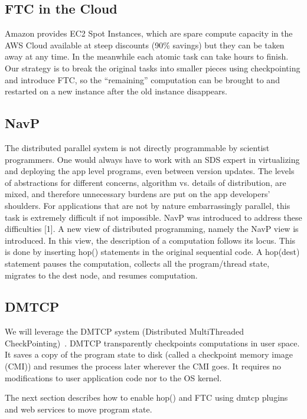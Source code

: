 \documentclass[conference]{IEEEtran}
\begin{document}
\subsection{FTC in the Cloud}
\label{subsec:s11}

Amazon provides EC2 Spot Instances, which are spare compute capacity in the AWS Cloud available at steep discounts (90\% savings) but they can be taken away at any time. In the meanwhile each atomic task can take hours to finish. Our strategy is to break the original tasks into smaller pieces using checkpointing and introduce FTC, so the ``remaining'' computation can be brought to and restarted on a new instance after the old instance disappears.

\subsection{NavP}
\label{subsec:s12}

The distributed parallel system is not directly programmable by scientist programmers. One would always have to work with an SDS expert in virtualizing and deploying the app level programs, even between version updates. The levels of abstractions for different concerns, algorithm vs. details of distribution, are mixed, and therefore unnecessary burdens are put on the app developers’ shoulders. For applications that are not by nature embarrassingly parallel, this task is extremely difficult if not impossible. NavP was introduced to address these difficulties [1]. A new view of distributed programming, namely the NavP view is introduced. In this view, the description of a computation follows its locus. This is done by inserting  hop() statements in the original sequential code. A hop(dest) statement pauses the computation, collects all the program/thread state, migrates to the dest node, and resumes computation.

\subsection{DMTCP}
\label{subsec:s13}

We will leverage the DMTCP system (Distributed MultiThreaded CheckPointing)~\cite{ansel2009dmtcp}. DMTCP transparently checkpoints computations in user space. It saves a copy of the program state to disk (called a checkpoint memory image (CMI)) and resumes the process later wherever the CMI goes. It requires no modifications to user application code nor to the OS kernel.

The next section describes how to enable hop() and FTC using dmtcp plugins and web services to move program state.
\end{document}
